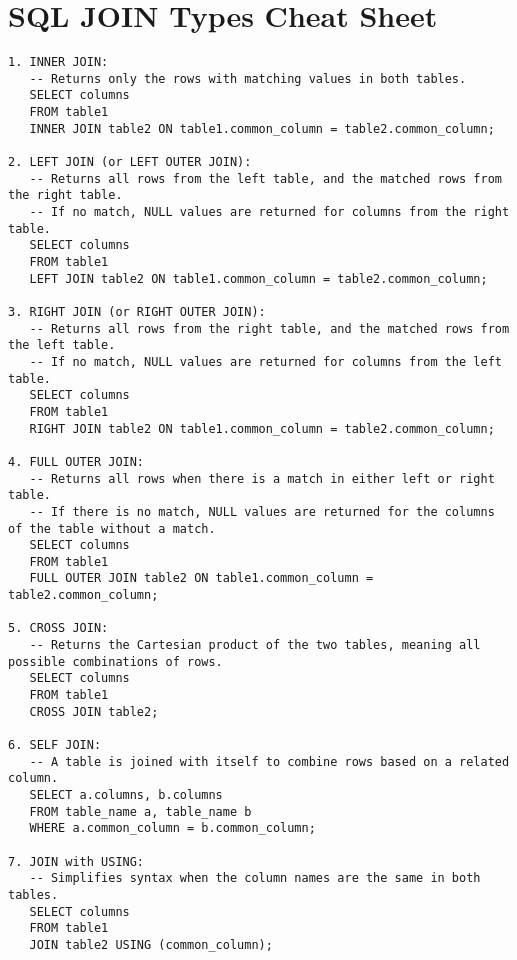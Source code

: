 \documentclass{article}
\begin{document}
\section*{SQL JOIN Types Cheat Sheet}

\begin{lstlisting}
1. INNER JOIN:
   -- Returns only the rows with matching values in both tables.
   SELECT columns
   FROM table1
   INNER JOIN table2 ON table1.common_column = table2.common_column;

2. LEFT JOIN (or LEFT OUTER JOIN):
   -- Returns all rows from the left table, and the matched rows from the right table. 
   -- If no match, NULL values are returned for columns from the right table.
   SELECT columns
   FROM table1
   LEFT JOIN table2 ON table1.common_column = table2.common_column;

3. RIGHT JOIN (or RIGHT OUTER JOIN):
   -- Returns all rows from the right table, and the matched rows from the left table. 
   -- If no match, NULL values are returned for columns from the left table.
   SELECT columns
   FROM table1
   RIGHT JOIN table2 ON table1.common_column = table2.common_column;

4. FULL OUTER JOIN:
   -- Returns all rows when there is a match in either left or right table.
   -- If there is no match, NULL values are returned for the columns of the table without a match.
   SELECT columns
   FROM table1
   FULL OUTER JOIN table2 ON table1.common_column = table2.common_column;

5. CROSS JOIN:
   -- Returns the Cartesian product of the two tables, meaning all possible combinations of rows.
   SELECT columns
   FROM table1
   CROSS JOIN table2;

6. SELF JOIN:
   -- A table is joined with itself to combine rows based on a related column.
   SELECT a.columns, b.columns
   FROM table_name a, table_name b
   WHERE a.common_column = b.common_column;

7. JOIN with USING:
   -- Simplifies syntax when the column names are the same in both tables.
   SELECT columns
   FROM table1
   JOIN table2 USING (common_column);
\end{lstlisting}
\end{document}
